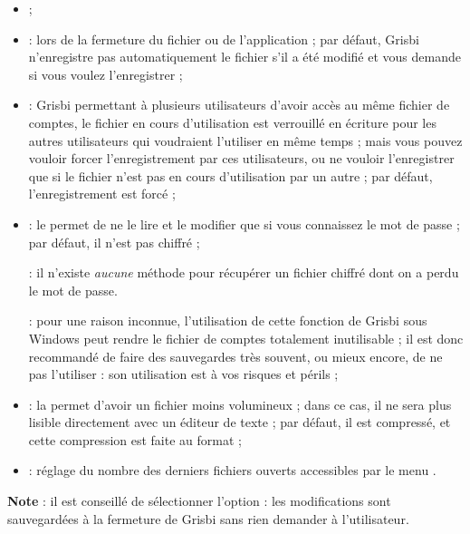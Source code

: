 \begin{itemize}
	\item {} ;
	\item {} : lors de la fermeture du fichier ou de l'application ; par défaut, Grisbi n'enregistre pas automatiquement le fichier s'il a été modifié et vous demande si vous voulez l'enregistrer ;
	\item {} : Grisbi permettant à plusieurs utilisateurs d'avoir accès au même fichier de comptes, le fichier en cours d'utilisation est verrouillé en écriture pour les autres utilisateurs qui voudraient l'utiliser en même temps ; mais vous pouvez vouloir forcer l'enregistrement par ces utilisateurs, ou ne vouloir l'enregistrer que si le fichier n'est pas en cours d'utilisation par un autre ; par défaut, l'enregistrement est forcé ;
	\item {} : le  permet de ne le lire et le modifier que si vous connaissez le mot de passe ; par défaut, il n'est pas chiffré ;

	 : il n'existe \emph{aucune} méthode pour récupérer un fichier chiffré dont on a perdu le mot de passe.

	 : pour une raison inconnue, l'utilisation de cette fonction de Grisbi sous Windows peut rendre le fichier de comptes totalement inutilisable ; il est donc recommandé de faire des sauvegardes très souvent, ou mieux encore, de ne pas l'utiliser : son utilisation est à vos risques et périls ;
	\item {} : la   permet d'avoir un fichier moins volumineux ; dans ce cas, il ne sera plus lisible directement avec un éditeur de texte ; par défaut, il est compressé, et cette compression est faite au format  ;
	\item {} : réglage du nombre des derniers fichiers ouverts accessibles par le menu .
\end{itemize}

\textbf{Note} : il est conseillé de sélectionner l'option   : les modifications sont sauvegardées à la fermeture de Grisbi sans rien demander à l'utilisateur.


